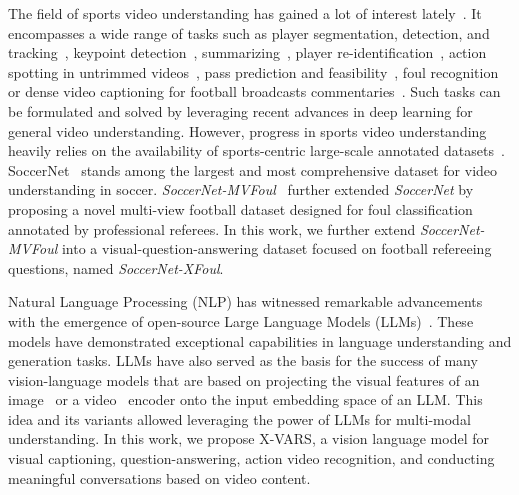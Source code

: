 The field of sports video understanding has gained a lot of interest lately~\cite{Thomas2017Computer}. It encompasses a wide range of tasks such as player segmentation, detection, and tracking~\cite{Cioppa2019ARTHuS, Maglo2022Efficient, Vandeghen2022SemiSupervised, Mansourian2023Multitask, Seweryn2024Improving-arxiv}, keypoint detection~\cite{Ludwig2023AllKeypoints}, summarizing~\cite{Gautam_2022, Midoglu_2024}, player re-identification~\cite{Somers2023Body, Mansourian2023Multitask}, action spotting in untrimmed videos~\cite{Cioppa2020AContextaware, Cioppa2021Camera,Hong2022Spotting,Soares2022Temporally, Soares2022Action-arxiv, Giancola2023Towards, Seweryn2023Survey-arxiv, Denize2023COMEDIAN-arxiv}, pass prediction and feasibility~\cite{ArbuesSanguesa2020Using, Honda2022Pass}, foul recognition~\cite{Held2023VARS, Fang2024Foul-arxiv} or dense video captioning for football broadcasts commentaries~\cite{Mkhallati2023SoccerNetCaption}. 
Such tasks can be formulated and solved by leveraging recent advances in deep learning for general video understanding. However, progress in sports video understanding heavily relies on the availability of sports-centric large-scale annotated datasets~\cite{Pappalardo2019Apublic,Yu2018Comprehensive,Scott2022SoccerTrack,Jiang2020SoccerDB,VanZandycke2022DeepSportradarv1, Istasse2023DeepSportradarv2, Midoglu2022MMSys}.
SoccerNet~\cite{Giancola2018SoccerNet,
Deliege2021SoccerNetv2,
Cioppa2022Scaling, 
Cioppa2022SoccerNetTracking, 
Giancola2022SoccerNet, 
Cioppa2023SoccerNetChallenge-arxiv} 
stands among the largest and most comprehensive dataset for video understanding in soccer. \emph{SoccerNet-MVFoul}~\cite{Held2023VARS} further extended \textit{SoccerNet} by proposing a novel multi-view football dataset designed for foul classification annotated by professional referees.
In this work, we further extend \emph{SoccerNet-MVFoul} into a visual-question-answering dataset focused on football refereeing questions, named \emph{SoccerNet-XFoul}.

Natural Language Processing (NLP) has witnessed remarkable advancements with the emergence of open-source Large Language Models (LLMs)~\cite{Touvron2023LLaMA-arxiv, Brown2020Language-arxiv, Devlin2018BERT-arxiv, Hoffmann2022Training-arxiv, Chowdhery2022PaLM-arxiv, Ouyang2022Training-arxiv, Workshop2022BLOOM-arxiv}. These models have demonstrated exceptional capabilities in language understanding and generation tasks. LLMs have also served as the basis for the success of many vision-language models that are based on projecting the visual features of an image~\cite{Zhu2023MiniGPT4-arxiv, Chen2023ShareGPT4V-arxiv, Huang2023Language-arxiv, Xu2022BridgeTower-arxiv, Liu2023Visual-arxiv} or a video~\cite{Ye2023mPLUGOwl2-arxiv, Alayrac2022Flamingo-arxiv} encoder onto the input embedding space of an LLM. This idea and its variants allowed leveraging the power of LLMs for multi-modal understanding. 
In this work, we propose X-VARS, a vision language model for visual captioning, question-answering, action video recognition, and conducting meaningful conversations based on video content.

